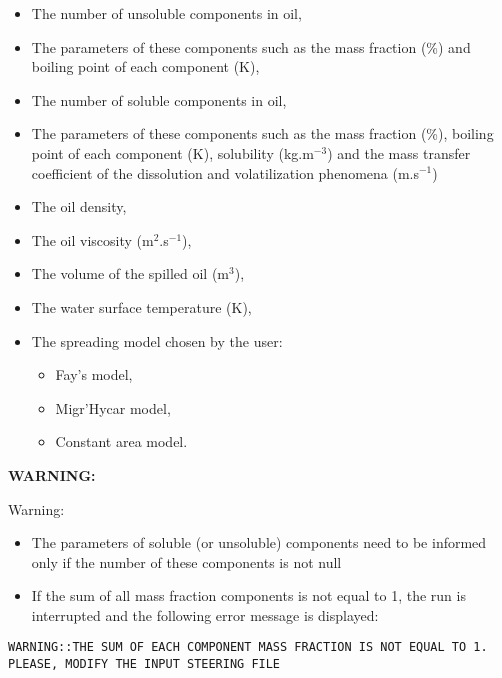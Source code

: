 \begin{itemize}
\item The number of unsoluble components in oil,

\item The parameters of these components such as the mass fraction (\%) and
boiling point of each component (K),

\item The number of soluble components in oil,

\item The parameters of these components such as the mass fraction (\%),
boiling point of each component (K), solubility (kg.m${}^{-3}$) and the mass
transfer coefficient of the dissolution and volatilization phenomena
(m.s${}^{-1}$)

\item The oil density,

\item The oil viscosity (m${}^{2}$.s${}^{-1}$),

\item The volume of the spilled oil (m${}^{3}$),

\item The water surface temperature (K),

\item The spreading model chosen by the user:

\begin{itemize}
\item Fay's model,

\item Migr'Hycar model,

\item Constant area model.
\end{itemize}
\end{itemize}

\textbf{WARNING:}

\begin{WarningBlock}{Warning:}
\begin{itemize}
\item The parameters of soluble (or unsoluble) components need to be informed
only if the number of these components is not null

\item If the sum of all mass fraction components is not equal to 1, the run is
interrupted and the following error message is displayed:
\end{itemize}

\begin{lstlisting}[language=TelemacCas]
WARNING::THE SUM OF EACH COMPONENT MASS FRACTION IS NOT EQUAL TO 1.
PLEASE, MODIFY THE INPUT STEERING FILE
\end{lstlisting}
\end{WarningBlock}


